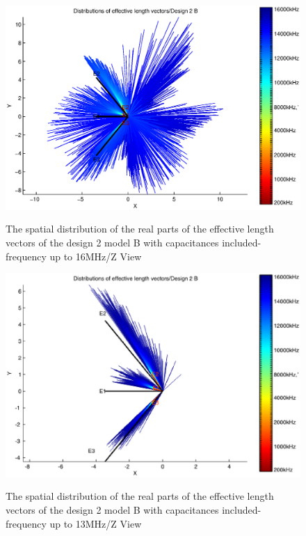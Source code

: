 \documentclass[a4paper,14pt]{extbook}
\begin{document}
\begin{figure}
\begin{center}
\includegraphics[scale=0.65]{HeffVerteilungD2-ZView_B_caps.eps} \\
\caption{The spatial distribution of the real parts of the effective length vectors of the design 2 model B with capacitances included-frequency up to 16MHz/Z View }\label{fig_heff_dist_D2_B_Z_View_caps}
\end{center}
\end{figure}

\begin{figure}
\begin{center}
\includegraphics[scale=0.65]{HeffVerteilungD2-ZView_B_caps2.eps} \\
\caption{The spatial distribution of the real parts of the effective length vectors of the design 2 model B with capacitances included-frequency up to 13MHz/Z View }\label{fig_heff_dist_D2_B_Z_View_caps2}
\end{center}
\end{figure}
\end{document}
